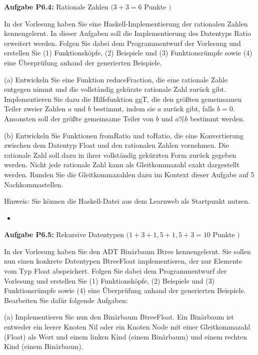 \textbf{Aufgabe P6.4:} Rationale Zahlen $(3+3=6$ Punkte $)$ 

In der Vorlesung haben Sie eine Haskell-Implementierung der rationalen Zahlen kennengelernt. In dieser Aufgaben soll die Implementierung des Datentyps Ratio erweitert werden. Folgen Sie dabei dem Programmentwurf der Vorlesung und erstellen Sie (1) Funktionsköpfe, (2) Beispiele und (3) Funktionsrümpfe sowie (4) eine Überprüfung anhand der generierten Beispiele.

(a) Entwickeln Sie eine Funktion reduceFraction, die eine rationale Zahle entgegen nimmt und die vollständig gekürzte rationale Zahl zurück gibt. Implementieren Sie dazu die Hilfsfunktion ggT, die den größten gemeinsamen Teiler zweier Zahlen $a$ und $b$ bestimmt, indem sie $a$ zurück gibt, falls $b=0$. Ansonsten soll der größte gemeinsame Teiler von $b$ und $a \% b$ bestimmt werden.

(b) Entwickeln Sie Funktionen fromRatio und toRatio, die eine Konvertierung zwischen dem Datentyp Float und den rationalen Zahlen vornehmen. Die rationale Zahl soll dazu in ihrer vollständig gekürzten Form zurück gegeben werden. Nicht jede rationale Zahl kann als Gleitkommazahl exakt dargestellt werden. Runden Sie die Gleitkommazahlen dazu im Kontext dieser Aufgabe auf 5 Nachkommastellen.

Hinweis: Sie können die Haskell-Datei aus dem Learnweb als Startpunkt nutzen.

\begin{itemize}
  \item []\inputminted{Haskell}{A6_4.hs}
\end{itemize}

\newpage

\textbf{ Aufgabe P6.5:} Rekursive Datentypen $(1+3+1,5+1,5+3=10$ Punkte $)$ 

In der Vorlesung haben Sie den ADT Binärbaum Btree kennengelernt. Sie sollen nun einen konkrete Datentypen BtreeFloat implementieren, der nur Elemente vom Typ Float abspeichert. Folgen Sie dabei dem Programmentwurf der Vorlesung und erstellen Sie (1) Funktionsköpfe, (2) Beispiele und (3) Funktionsrümpfe sowie (4) eine Überprüfung anhand der generierten Beispiele. Bearbeiten Sie dafür folgende Aufgaben:

(a) Implementieren Sie nun den Binärbaum BtreeFloat. Ein Binärbaum ist entweder ein leerer Knoten Nil oder ein Knoten Node mit einer Gleitkommazahl (Float) als Wert und einem linken Kind (einem Binärbaum) und einem rechten Kind (einem Binärbaum).

